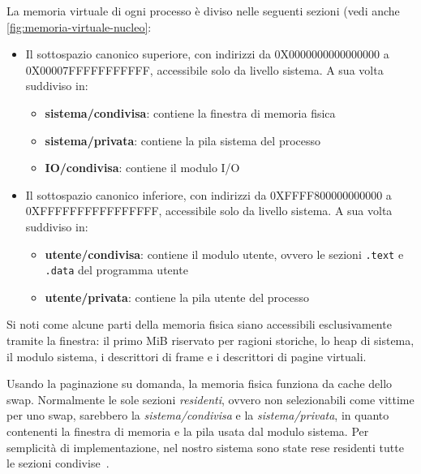La memoria virtuale di ogni processo è diviso nelle seguenti sezioni (vedi anche \ref{fig:memoria-virtuale-nucleo}: 
\begin{itemize}
	\item Il sottospazio canonico superiore, con indirizzi da 0X0000000000000000 a 0X00007FFFFFFFFFFF, accessibile solo da livello sistema. A sua volta suddiviso in:
	\begin{itemize}
		\item \textbf{sistema/condivisa}: contiene la finestra di memoria fisica
		\item \textbf{sistema/privata}: contiene la pila sistema del processo
		\item \textbf{IO/condivisa}: contiene il modulo I/O
	\end{itemize}
	\item Il sottospazio canonico inferiore, con indirizzi da 0XFFFF800000000000 a 0XFFFFFFFFFFFFFFFF, accessibile solo da livello sistema. A sua volta suddiviso in:
	\begin{itemize}
		\item \textbf{utente/condivisa}: contiene il modulo utente, ovvero le sezioni \texttt{.text} e \texttt{.data} del programma utente
		\item \textbf{utente/privata}: contiene la pila utente del processo
	\end{itemize}
\end{itemize}
Si noti come alcune parti della memoria fisica siano accessibili esclusivamente tramite la finestra: il primo MiB riservato per ragioni storiche, lo heap di sistema, il modulo sistema, i descrittori di frame e i descrittori di pagine virtuali.

Usando la paginazione su domanda, la memoria fisica funziona da cache dello swap. Normalmente le sole sezioni \emph{residenti}, ovvero non selezionabili come vittime per uno swap, sarebbero la \emph{sistema/condivisa} e la \emph{sistema/privata}, in quanto contenenti la finestra di memoria e la pila usata dal modulo sistema. Per semplicità di implementazione, nel nostro sistema sono state rese residenti tutte le sezioni condivise~\cite{lettieri:paginazione-nel-nucleo}.
